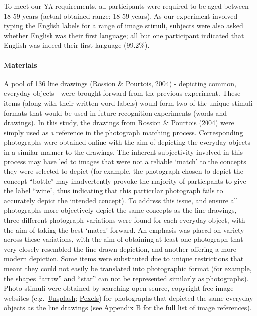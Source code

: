 \documentclass[
  11pt,
]{article}
\begin{document}
To meet our YA requirements, all participants were required to be aged
between 18-59 years (actual obtained range: 18-59 years). As our
experiment involved typing the English labels for a range of image
stimuli, subjects were also asked whether English was their first
language; all but one participant indicated that English was indeed
their first language (99.2\%).

\hypertarget{materials-1}{%
\paragraph{Materials}\label{materials-1}}

A pool of 136 line drawings (Rossion \& Pourtois, 2004) - depicting
common, everyday objects - were brought forward from the previous
experiment. These items (along with their written-word labels) would
form two of the unique stimuli formats that would be used in future
recognition experiments (words and drawings). In this study, the
drawings from Rossion \& Pourtois (2004) were simply used as a reference
in the photograph matching process. Corresponding photographs were
obtained online with the aim of depicting the everyday objects in a
similar manner to the drawings. The inherent subjectivity involved in
this process may have led to images that were not a reliable `match' to
the concepts they were selected to depict (for example, the photograph
chosen to depict the concept ``bottle'' may inadvertently provoke the
majority of participants to give the label ``wine'', thus indicating
that this particular photograph fails to accurately depict the intended
concept). To address this issue, and ensure all photographs more
objectively depict the same concepts as the line drawings, three
different photograph variations were found for each everyday object,
with the aim of taking the best `match' forward. An emphasis was placed
on variety across these variations, with the aim of obtaining at least
one photograph that very closely resembled the line-drawn depiction, and
another offering a more modern depiction. Some items were substituted
due to unique restrictions that meant they could not easily be
translated into photographic format (for example, the shapes ``arrow''
and ``star'' can not be represented similarly as photographs). Photo
stimuli were obtained by searching open-source, copyright-free image
websites (e.g.~\href{https://unsplash.com/}{Unsplash};
\href{https://www.pexels.com/}{Pexels}) for photographs that depicted
the same everyday objects as the line drawings (see Appendix B for the
full list of image references).
\end{document}

